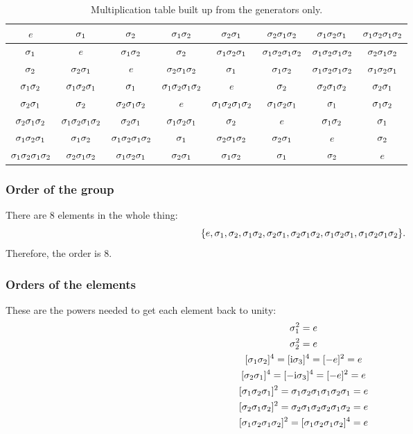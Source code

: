 \documentclass[11pt, english, fleqn, DIV=15, headinclude, BCOR=1cm]{scrartcl}
\begin{document}
\begin{landscape}
    \begin{table}[p]
        \centering
        \begin{tabular}{c|ccccccc}
            $e$ & $\1$ & $\2$ & $\1\2$ & $\2\1$ & $\2\1\2$ & $\1\2\1$ & $\1\2\1\2$ \\
            \midrule
            $\1$ & $e$ & $\1\2$ & $\2$ & $\1\2\1$ & $\1\2\1\2$ & $\1\2\1\2$ & $\2\1\2$ \\
            $\2$ & $\2\1$ & $e$ & $\2\1\2$ & $\1$ & $\1\2$ & $\1\2\1\2$ & $\1\2\1$ \\
            $\1\2$ & $\1\2\1$ & $\1$ & $\1\2\1\2$ & $e$ & $\2$ & $\2\1\2$ & $\2\1$ \\
            $\2\1$ & $\2$ & $\2\1\2$ & $e$ & $\1\2\1\2$ & $\1\2\1$ & $\1$ & $\1\2$ \\
            $\2\1\2$ & $\1\2\1\2$ & $\2\1$ & $\1\2\1$ & $\2$ & $e$ & $\1\2$ & $\1$ \\
            $\1\2\1$ & $\1\2$ & $\1\2\1\2$ & $\1$ & $\2\1\2$ & $\2\1$ & $e$ & $\2$ \\
            $\1\2\1\2$ & $\2\1\2$ & $\1\2\1$ & $\2\1$ & $\1\2$ & $\1$ & $\2$ & $e$ \\
        \end{tabular}
        \caption{%
            Multiplication table built up from the generators only.
        }
        \label{tab:generators}
    \end{table}
\end{landscape}

\subsubsection{Order of the group}

There are 8 elements in the whole thing:
\[
    \{ e, \1, \2, \1\2, \2\1, \2\1\2, \1\2\1, \1\2\1\2 \}.
\]
Therefore, the order is 8.

\subsubsection{Orders of the elements}

These are the powers needed to get each element back to unity:
\begin{gather*}
    \1^2 = e \\
    \2^2 = e \\
    [\1\2]^4 = [\iup \3]^4 = [-e]^2 = e \\
    [\2\1]^4 = [-\iup \3]^4 = [-e]^2 = e \\
    [\1\2\1]^2 = \1\2\1 \1\2\1 = e \\
    [\2\1\2]^2 = \2\1\2 \2\1\2 = e \\
    [\1\2\1\2]^2 = [\1\2\1\2]^4 = e
\end{gather*}
\end{document}
